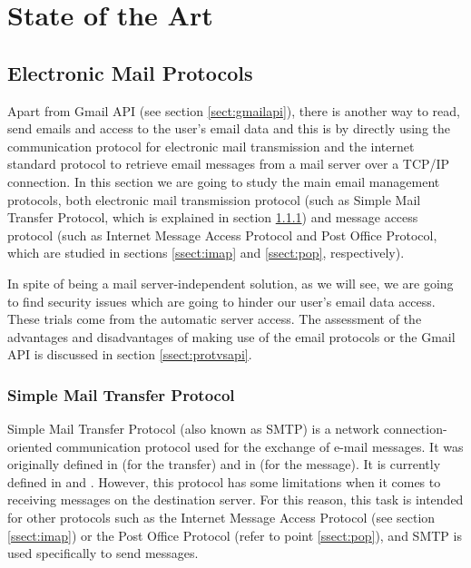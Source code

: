 \chapter{State of the Art}
\label{cap:estadoDeLaCuestion}



\section{Electronic Mail Protocols}
Apart from Gmail API (see section \ref{sect:gmailapi}), there is another way to read, send emails and access to the user's email data and this is by directly using the communication protocol for electronic mail transmission and the internet standard protocol to retrieve email messages from a mail server over a TCP/IP connection. In this section we are going to study the main email management protocols, both electronic mail transmission protocol (such as Simple Mail Transfer Protocol, which is explained in section \ref{ssect:smtp}) and message access protocol (such as Internet Message Access Protocol and Post Office Protocol, which are studied in sections \ref{ssect:imap} and \ref{ssect:pop}, respectively).

In spite of being a mail server-independent solution, as we will see, we are going to find security issues which are going to hinder our user's email data access. These trials come from the automatic server access. The assessment of the advantages and disadvantages of making use of the email protocols or the Gmail API is discussed in section \ref{ssect:protvsapi}.

\subsection{Simple Mail Transfer Protocol} \label{ssect:smtp}

Simple Mail Transfer Protocol (also known as SMTP) is a network connection-oriented communication protocol used for the exchange of e-mail messages. It was originally defined in \cite{rfc821} (for the transfer) and in \cite{rfc822} (for the message). It is currently defined in \cite{rfc5321} and \cite{rfc5322}. However, this protocol has some limitations when it comes to receiving messages on the destination server. For this reason, this task is intended for other protocols such as the Internet Message Access Protocol (see section \ref{ssect:imap}) or the Post Office Protocol (refer to point \ref{ssect:pop}), and SMTP is used specifically to send messages.

